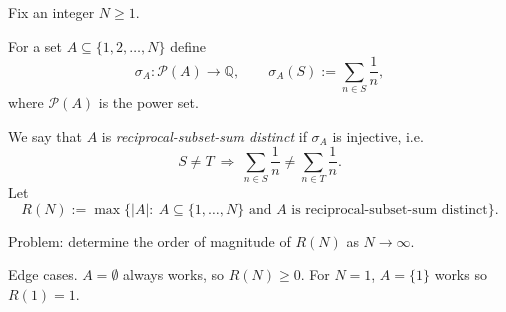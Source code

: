 Fix an integer $N\ge 1$.

For a set $A\subseteq\{1,2,\dots,N\}$ define
\[
\sigma_A: \mathcal P(A)\to\mathbb Q,\qquad \sigma_A(S):=\sum_{n\in S}\frac1n,
\]
where $\mathcal P(A)$ is the power set.

We say that $A$ is \emph{reciprocal-subset-sum distinct} if $\sigma_A$ is injective, i.e.
\[
S\neq T\ \Longrightarrow\ \sum_{n\in S}\frac1n\neq\sum_{n\in T}\frac1n.
\]
Let
\[
R(N):=\max\bigl\{|A|:\ A\subseteq\{1,\dots,N\}\text{ and $A$ is reciprocal-subset-sum distinct}\bigr\}.
\]

Problem: determine the order of magnitude of $R(N)$ as $N\to\infty$.

Edge cases.
$A=\emptyset$ always works, so $R(N)\ge 0$. For $N=1$, $A=\{1\}$ works so $R(1)=1$.
